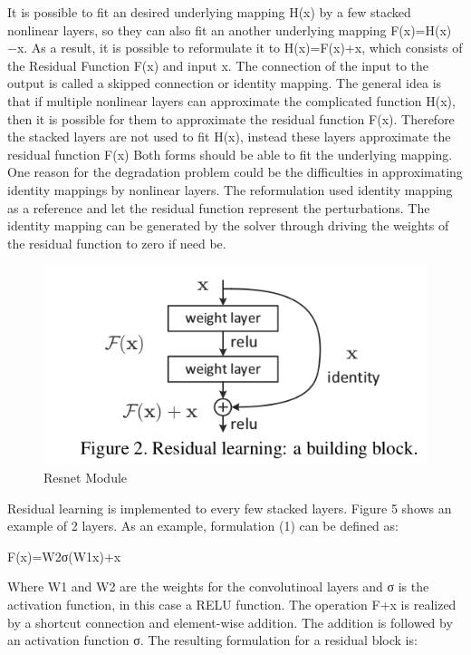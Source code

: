 \documentclass[a4paper,11pt]{article}
\begin{document}
	 It is possible to fit an desired underlying mapping H(x)
	 by a few stacked nonlinear layers, so they can also fit an another underlying mapping F(x)=H(x)−x. As a result, it is possible to reformulate it to H(x)=F(x)+x, which consists of the Residual Function F(x) and input x. The connection of the input to the output is called a skipped connection or identity mapping. The general idea is that if multiple nonlinear layers can approximate the complicated function H(x), then it is possible for them to approximate the residual function F(x). Therefore the stacked layers are not used to fit H(x), instead these layers approximate the residual function F(x)
	 Both forms should be able to fit the underlying mapping.
	 One reason for the degradation problem could be the difficulties in approximating identity mappings by nonlinear layers. The reformulation used identity mapping as a reference and let the residual function represent the perturbations. The identity mapping can be generated by the solver through driving the weights of the residual function to zero if need be. 
	 
	 \begin{figure}[H]
	 	\includegraphics[width = \textwidth]{resnet.png}
	 	\caption{Resnet Module}
	 \end{figure}
	 
	 Residual learning is implemented to every few stacked layers. Figure 5 shows an example of 2 layers. As an example, formulation (1) can be defined as:
	 
	                             F(x)=W2σ(W1x)+x
	 
	 
	 Where W1 and W2 are the weights for the convolutinoal layers and σ is the activation function, in this case a RELU function. The operation F+x is realized by a shortcut connection and element-wise addition. The addition is followed by an activation function σ. The resulting formulation for a residual block is:
	 
\end{document}

